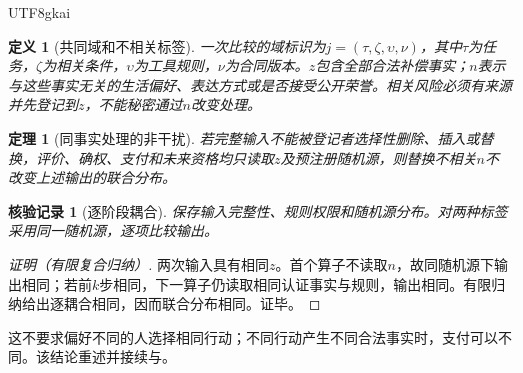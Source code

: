 \documentclass[12pt,a4paper,openany]{report}
\newtheorem{definition}{定义}[chapter]
\newtheorem{theorem}{定理}[chapter]
\newtheorem{Certificate}{核验记录}[chapter]
\begin{document}
\begin{CJK*}{UTF8}{gkai}
\begin{definition}[共同域和不相关标签]
\label{def:context}
一次比较的域标识为$j=(\tau,\zeta,\upsilon,\nu)$，其中$\tau$为任务，$\zeta$为相关条件，$\upsilon$为工具规则，$\nu$为合同版本。$z$包含全部合法补偿事实；$n$表示与这些事实无关的生活偏好、表达方式或是否接受公开荣誉。相关风险必须有来源并先登记到$z$，不能秘密通过$n$改变处理。
\end{definition}
\begin{theorem}[同事实处理的非干扰]
\label{thm:noninterference}
若完整输入不能被登记者选择性删除、插入或替换，评价、确权、支付和未来资格均只读取$z$及预注册随机源，则替换不相关$n$不改变上述输出的联合分布。
\end{theorem}
\begin{Certificate}[逐阶段耦合]
保存输入完整性、规则权限和随机源分布。对两种标签采用同一随机源，逐项比较输出。
\end{Certificate}
\begin{proof}[证明（有限复合归纳）]
两次输入具有相同$z$。首个算子不读取$n$，故同随机源下输出相同；若前$k$步相同，下一算子仍读取相同认证事实与规则，输出相同。有限归纳给出逐耦合相同，因而联合分布相同。证毕。
\end{proof}
这不要求偏好不同的人选择相同行动；不同行动产生不同合法事实时，支付可以不同。该结论重述并接续\cite[“同事实的非相关身份不干扰”]{SourceSupplement}与\cite[“不相关偏好标签不得决定既有收益权”]{SourcePreference}。


\end{CJK*}
\end{document}
